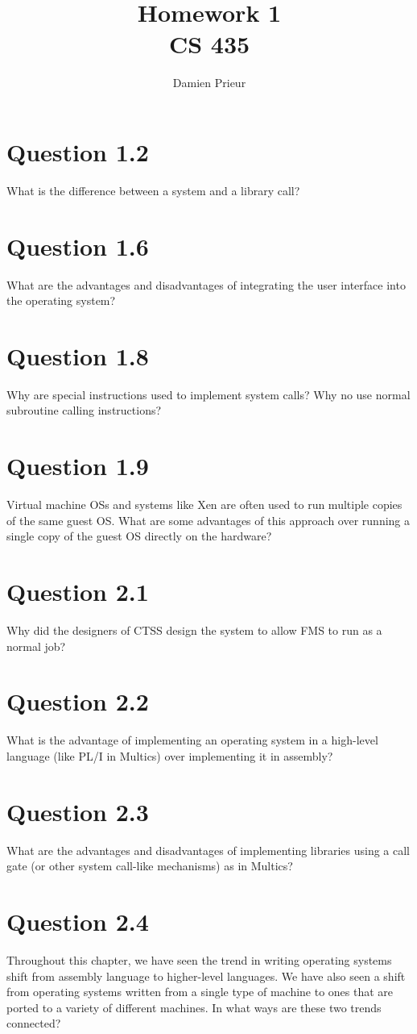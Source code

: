 \documentclass{article}
\author{Damien Prieur}
\title{Homework 1 \\ CS 435}
\date{}
\begin{document}
\maketitle

\section*{Question 1.2}
What is the difference between a system and a library call?

\section*{Question 1.6}
What are the advantages and disadvantages of integrating the user interface into the operating system?

\section*{Question 1.8}
Why are special instructions used to implement system calls? Why no use normal subroutine calling instructions?

\section*{Question 1.9}
Virtual machine OSs and systems like Xen are often used to run multiple copies of the same guest OS.
What are some advantages of this approach over running a single copy of the guest OS directly on the hardware?

\section*{Question 2.1}
Why did the designers of CTSS design the system to allow FMS to run as a normal job?
\section*{Question 2.2}
What is the advantage of implementing an operating system in a high-level language (like PL/I in Multics) over implementing it in assembly?
\section*{Question 2.3}
What are the advantages and disadvantages of implementing libraries using a call gate (or other system call-like mechanisms) as in Multics?
\section*{Question 2.4}
Throughout this chapter, we have seen the trend in writing operating systems shift from assembly language to higher-level languages.
We have also seen a shift from operating systems written from a single type of machine to ones that are ported to a variety of different machines. In what ways are these two trends connected?
\end{document}
